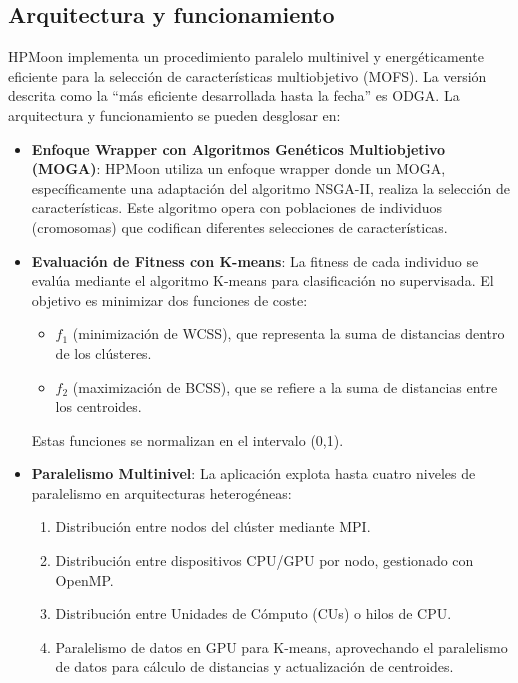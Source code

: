 \subsection{Arquitectura y funcionamiento}\label{subsec:hpm_funcionamiento}
HPMoon implementa un procedimiento paralelo multinivel y energéticamente eficiente para la selección de características multiobjetivo (\acs{MOFS}). La versión descrita como la ``más eficiente desarrollada hasta la fecha'' es ODGA. La arquitectura y funcionamiento se pueden desglosar en:

\begin{itemize}
    \item \textbf{Enfoque Wrapper con Algoritmos Genéticos Multiobjetivo (MOGA)}: HPMoon utiliza un enfoque wrapper donde un MOGA, específicamente una adaptación del algoritmo NSGA-II, realiza la selección de características. Este algoritmo opera con poblaciones de individuos (cromosomas) que codifican diferentes selecciones de características.
    \item \textbf{Evaluación de Fitness con K-means}: La fitness de cada individuo se evalúa mediante el algoritmo K-means para clasificación no supervisada. El objetivo es minimizar dos funciones de coste:
          \begin{itemize}
              \item $f_1$ (minimización de WCSS), que representa la suma de distancias dentro de los clústeres.
              \item $f_2$ (maximización de BCSS), que se refiere a la suma de distancias entre los centroides.
          \end{itemize}
          Estas funciones se normalizan en el intervalo (0,1).
    \item \textbf{Paralelismo Multinivel}: La aplicación explota hasta cuatro niveles de paralelismo en arquitecturas heterogéneas:
          \begin{enumerate}
              \item Distribución entre nodos del clúster mediante MPI.
              \item Distribución entre dispositivos CPU/GPU por nodo, gestionado con OpenMP.
              \item Distribución entre Unidades de Cómputo (CUs) o hilos de CPU.
              \item Paralelismo de datos en GPU para K-means, aprovechando el paralelismo de datos para cálculo de distancias y actualización de centroides.
          \end{enumerate}

\end{itemize}
